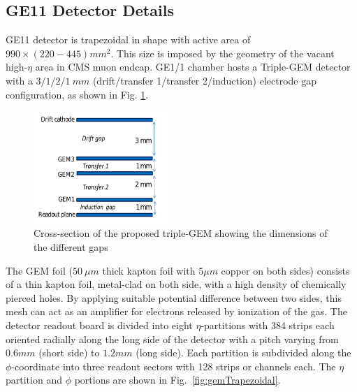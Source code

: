 \subsection{GE11 Detector Details} %
\label{sub:ge11_detector_details}
GE11 detector is trapezoidal in shape with active area of $990\times (220-445)mm^2$.
This size is imposed by the geometry of the vacant high-$\eta$ area in CMS muon endcap.
GE1/1 chamber hosts a Triple-GEM detector with a $3/1/2/1~mm$ (drift/transfer 1/transfer 2/induction) electrode gap configuration, as shown in Fig. \ref{fig:tripple-gem}.
\begin{figure}[!htbp]
    \begin{center}
        \includegraphics[width=0.45\textwidth]{figures/GEM/tripple-gem.png}
        \caption{Cross-section of the proposed triple-GEM showing the dimensions of the different gaps}
        \label{fig:tripple-gem}
    \end{center}
\end{figure} 
The GEM foil ($50~\mu m$ thick kapton foil with $5\mu m$ copper on both sides) consists of a thin kapton foil, metal-clad on both side, with a high density of chemically pierced holes.
By applying suitable potential difference between two sides, this mesh can act as an amplifier for electrons released by ionization of the gas.
The detector readout board is divided into eight $\eta$-partitions with 384 strips each oriented radially along the long side of the detector with a pitch varying from $0.6mm$ (short side) to $1.2mm$ (long side).
Each partition is subdivided along the $\phi$-coordinate into three readout sectors with 128 strips or channels each. The $\eta$ partition and $\phi$ portions are shown in Fig.~\ref{fig:gemTrapezoidal}.
